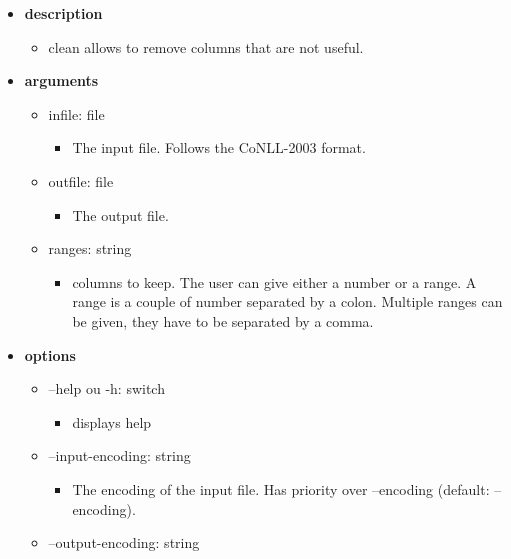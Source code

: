 \documentclass[manual-fr.tex]{subfiles}
\begin{document}
\begin{itemize}
    \item[] \textbf{description}
        \begin{itemize}
            \item[] clean allows to remove columns that are not useful.
        \end{itemize}
    \item[] \textbf{arguments}
        \begin{itemize}
            \item[] infile: file
                \begin{itemize}
                    \item[] The input file. Follows the CoNLL-2003 format.
                \end{itemize}
            \item[] outfile: file
                \begin{itemize}
                    \item[] The output file.
                \end{itemize}
            \item[] ranges: string
                \begin{itemize}
                    \item[] columns to keep. The user can give either a number or a range. A range is a couple of number separated by a colon. Multiple ranges can be given, they have to be separated by a comma.
                \end{itemize}
        \end{itemize}
    \item[] \textbf{options}
        \begin{itemize}
            \item[] --help ou -h: switch
                \begin{itemize}
                    \item[] displays help
                \end{itemize}
            \item[] --input-encoding: string
                \begin{itemize}
                    \item[] The encoding of the input file. Has priority over --encoding (default: --encoding).
                \end{itemize}
            \item[] --output-encoding: string
                \begin{itemize}

\end{itemize}
\end{itemize}
\end{itemize}
\end{document}
